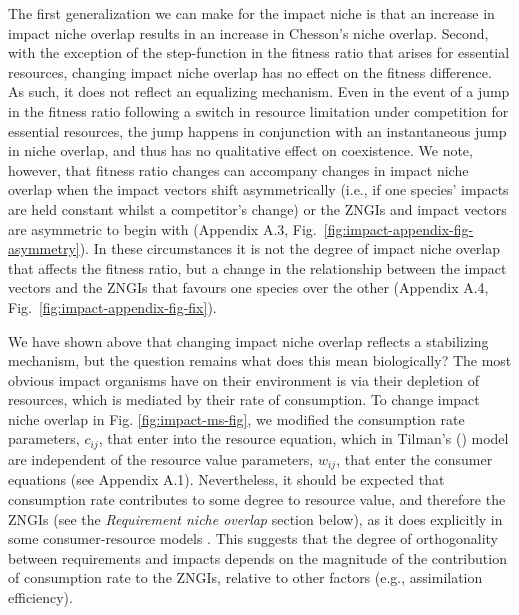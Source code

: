 The first generalization we can make for the impact niche is that an increase in impact niche overlap results in an increase in Chesson's niche overlap. Second, with the exception of the step-function in the fitness ratio that arises for essential resources, changing impact niche overlap has no effect on the fitness difference. As such, it does not reflect an equalizing mechanism. Even in the event of a jump in the fitness ratio following a switch in resource limitation under competition for essential resources, the jump happens in conjunction with an instantaneous jump in niche overlap, and thus has no qualitative effect on coexistence. We note, however, that fitness ratio changes can accompany changes in impact niche overlap when the impact vectors shift asymmetrically (i.e., if one species' impacts are held constant whilst a competitor's change) or the ZNGIs and impact vectors are asymmetric to begin with (Appendix A.3, Fig.~\ref{fig:impact-appendix-fig-asymmetry}). In these circumstances it is not the degree of impact niche overlap that affects the fitness ratio, but a change in the relationship between the impact vectors and the ZNGIs that favours one species over the other (Appendix A.4, Fig.~\ref{fig:impact-appendix-fig-fix}).
\par


We have shown above that changing impact niche overlap reflects a stabilizing mechanism, but the question remains what does this mean biologically? The most obvious impact organisms have on their environment is via their depletion of resources, which is mediated by their rate of consumption. To change impact niche overlap in Fig. \ref{fig:impact-ms-fig}, we modified the consumption rate parameters, $c_{ij}$, that enter into the resource equation, which in Tilman's (\citeyear{tilman1982}) model are independent of the resource value parameters, $w_{ij}$, that enter the consumer equations (see Appendix A.1). Nevertheless, it should be expected that consumption rate contributes to some degree to resource value, and therefore the ZNGIs (see the \textit{Requirement niche overlap} section below), as it does explicitly in some consumer-resource models \citep[e.g., in the analytical form given by][]{Chase2003}. This suggests that the degree of orthogonality between requirements and impacts depends on the magnitude of the contribution of consumption rate to the ZNGIs, relative to other factors (e.g., assimilation efficiency).
\par


